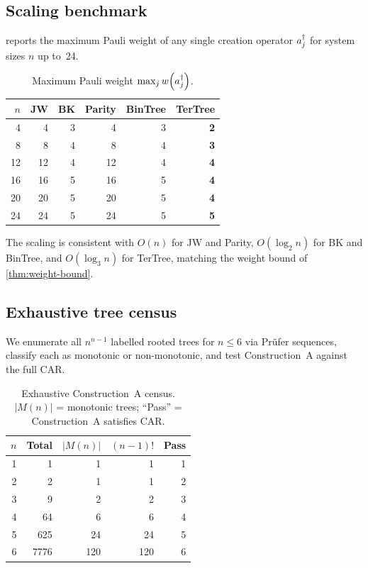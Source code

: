 \subsection{Scaling benchmark}
\label{sec:val-scaling}

 reports the maximum Pauli weight of any single
creation operator $a_{j}^{\dagger}$ for system sizes $n$ up to~24.

\begin{table}[t]
\centering
\caption{Maximum Pauli weight $\max_j w\!\left(a_{j}^{\dagger}\right)$.}
\label{tab:scaling}
\begin{tabular}{@{}rrrrrr@{}}
\toprule
$n$ & JW & BK & Parity & BinTree & TerTree \\
\midrule
 4  &  4 &  3 &  4 &  3 & \textbf{2} \\
 8  &  8 &  4 &  8 &  4 & \textbf{3} \\
12  & 12 &  4 & 12 &  4 & \textbf{4} \\
16  & 16 &  5 & 16 &  5 & \textbf{4} \\
20  & 20 &  5 & 20 &  5 & \textbf{4} \\
24  & 24 &  5 & 24 &  5 & \textbf{5} \\
\bottomrule
\end{tabular}
\end{table}

The scaling is consistent with $O(n)$ for JW and Parity,
$O(\log_2 n)$ for BK and BinTree, and $O(\log_3 n)$ for TerTree,
matching the weight bound of \cref{thm:weight-bound}.

\subsection{Exhaustive tree census}
\label{sec:val-census}

We enumerate all $n^{n-1}$ labelled rooted trees for $n \le 6$ via
Pr\"ufer sequences, classify each as monotonic or non-monotonic, and
test Construction~A against the full CAR.

\begin{table}[t]
\centering
\caption{Exhaustive Construction~A census. $|M(n)|$ =
  monotonic trees; ``Pass'' = Construction~A satisfies CAR.}
\label{tab:census}
\begin{tabular}{@{}rrrrr@{}}
\toprule
$n$ & Total & $|M(n)|$ & $(n{-}1)!$ & Pass \\
\midrule
1 &       1 &     1 &     1 &  1 \\
2 &       2 &     1 &     1 &  2 \\
3 &       9 &     2 &     2 &  3 \\
4 &      64 &     6 &     6 &  4 \\
5 &     625 &    24 &    24 &  5 \\
6 &    7776 &   120 &   120 &  6 \\
\bottomrule
\end{tabular}
\end{table}


